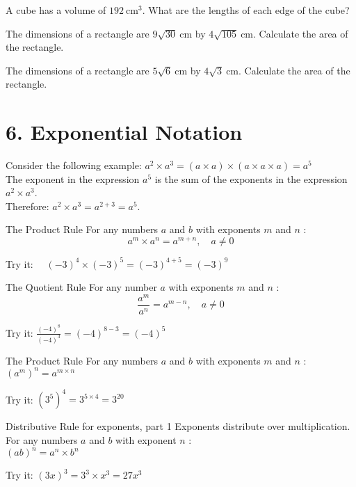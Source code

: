 \documentclass[12pt,fleqn]{book}
\newcommand{\prb}[1]{\begin{Exercise}#1\end{Exercise}}
\begin{document}
\prb{
    A cube has a volume of $192 \mathrm{~cm}^3$. What are the lengths of each edge of the cube?
}

\prb{
    The dimensions of a rectangle are $9 \sqrt{30} \mathrm{~cm}$ by $4 \sqrt{105} \mathrm{~cm}$. Calculate the area of the rectangle.
}

\prb{
The dimensions of a rectangle are $5 \sqrt{6} \mathrm{~cm}$ by $4 \sqrt{3} \mathrm{~cm}$. Calculate the area of the rectangle.}



\chapter{6. Exponential Notation}
Consider the following example: $a^{2} \times a^{3}=(a \times a) \times(a \times a \times a)=a^{5}$\\
The exponent in the expression $a^{5}$ is the sum of the exponents in the expression $a^{2} \times a^{3}$.\\
Therefore: $a^{2} \times a^{3}=a^{2+3}=a^{5}$.

\begin{thm}{The Product Rule}{}
For any numbers $a$ and $b$ with exponents $m$ and $n$ :
\[
a^{m} \times a^{n}=a^{m+n}, \quad a \neq 0
\]
\end{thm}
Try it:
$\quad(-3)^{4} \times(-3)^{5}=(-3)^{4+5}=(-3)^{9}$
\\[2in]

\begin{thm}{The Quotient Rule}{}
For any number $a$ with exponents $m$ and $n$ :
\[
\frac{a^{m}}{a^{n}}=a^{m-n}, \quad a \neq 0
\]
\end{thm}
Try it: $\frac{(-4)^{8}}{(-4)^{3}}=(-4)^{8-3}=(-4)^{5}$
\\[2in]
 
\begin{thm}{The Product Rule}{}
For any numbers $a$ and $b$ with exponents $m$ and $n$ :\\
$\left(a^{m}\right)^{n}=a^{m \times n}$
\end{thm}
Try it:
$\left(3^{5}\right)^{4}=3^{5 \times 4}=3^{20}$
\\[2in]



\begin{thm}{Distributive Rule for exponents, part 1}{}
    Exponents distribute over multiplication.
For any numbers $a$ and $b$ with exponent $n$ :\\
$(a b)^{n}=a^{n} \times b^{n}$
\end{thm}
Try it: $(3 x)^{3}=3^{3} \times x^{3}=27 x^{3}$
\end{document}
